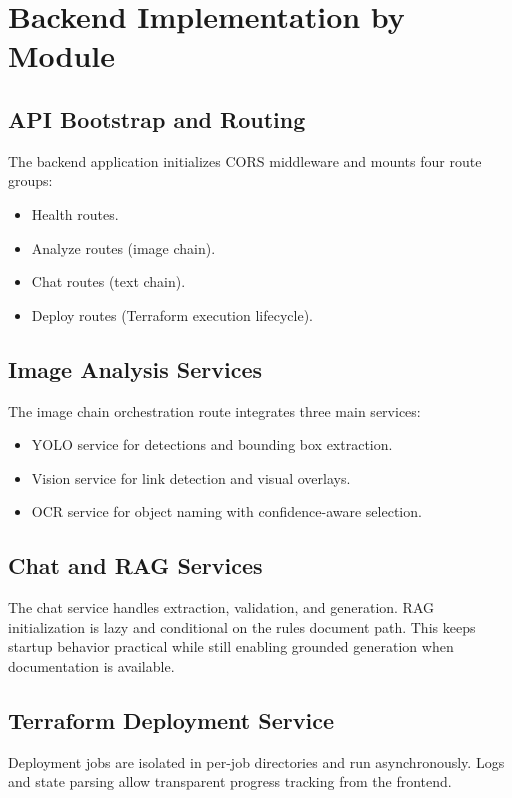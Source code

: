 \documentclass[12pt,a4paper,openany]{report}
\begin{document}
\section{Backend Implementation by Module}

\subsection{API Bootstrap and Routing}

The backend application initializes CORS middleware and mounts four route groups:
\begin{itemize}
    \item Health routes.
    \item Analyze routes (image chain).
    \item Chat routes (text chain).
    \item Deploy routes (Terraform execution lifecycle).
\end{itemize}

\subsection{Image Analysis Services}

The image chain orchestration route integrates three main services:
\begin{itemize}
    \item YOLO service for detections and bounding box extraction.
    \item Vision service for link detection and visual overlays.
    \item OCR service for object naming with confidence-aware selection.
\end{itemize}

\subsection{Chat and RAG Services}

The chat service handles extraction, validation, and generation. RAG initialization is lazy and conditional on the rules document path. This keeps startup behavior practical while still enabling grounded generation when documentation is available.

\subsection{Terraform Deployment Service}

Deployment jobs are isolated in per-job directories and run asynchronously. Logs and state parsing allow transparent progress tracking from the frontend.
\end{document}
